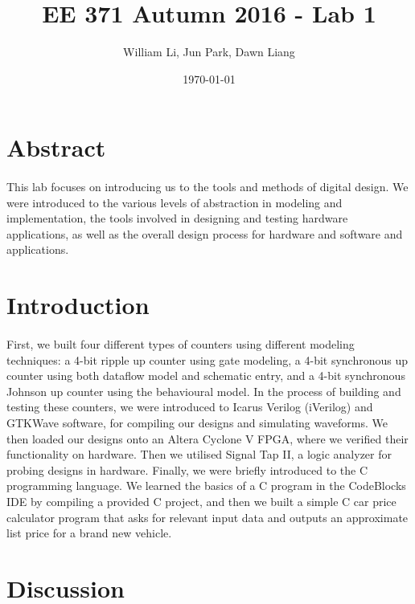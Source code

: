 \documentclass{article}
\title{EE 371 Autumn 2016 - Lab 1}
\date{\today}
\author{William Li, Jun Park, Dawn Liang}
\begin{document}
\maketitle
\newpage

\tableofcontents
\newpage


\section{Abstract}
\paragraph{} This lab focuses on introducing us to the tools and methods of digital design. We were introduced to the various levels of abstraction in modeling and implementation, the tools involved in designing and testing hardware applications, as well as the overall design process for hardware and software and applications.

\section{Introduction}
\paragraph{} First, we built four different types of counters using different modeling techniques: a 4-bit ripple up counter using gate modeling, a 4-bit synchronous up counter using both dataflow model and schematic entry, and a 4-bit synchronous Johnson up counter using the behavioural model. In the process of building and testing these counters, we were introduced to Icarus Verilog (iVerilog) and GTKWave software, for compiling our designs and simulating waveforms. We then loaded our designs onto an Altera Cyclone V FPGA, where we verified their functionality on hardware. Then we utilised Signal Tap II, a logic analyzer for probing designs in hardware. Finally, we were briefly introduced to the C programming language. We learned the basics of a C program in the CodeBlocks IDE by compiling a provided C project, and then we built a simple C car price calculator program that asks for relevant input data and outputs an approximate list price for a brand new vehicle.

\section{Discussion}
\end{document}
